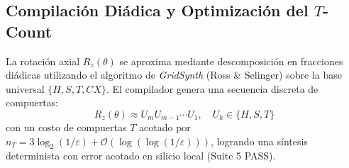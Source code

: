 \subsection{Compilación Diádica y Optimización del $T$-Count}
La rotación axial $R_z(\theta)$ se aproxima mediante descomposición en fracciones diádicas utilizando el algoritmo de \emph{GridSynth} (Ross \& Selinger) sobre la base universal $\{H, S, T, CX\}$. El compilador genera una secuencia discreta de compuertas:
\begin{equation}
R_z(\theta) \approx U_m U_{m-1} \cdots U_1, \quad U_k \in \{H, S, T\}
\end{equation}
con un costo de compuertas $T$ acotado por $n_T = 3 \log_2(1/\varepsilon) + \mathcal{O}(\log(\log(1/\varepsilon)))$, logrando una síntesis determinista con error acotado en silicio local (Suite 5 PASS).
